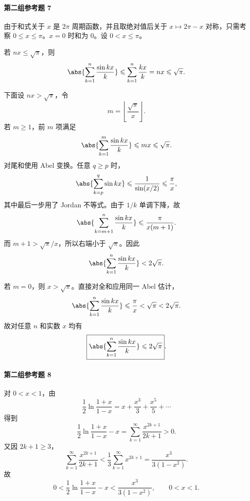 \paragraph{第二组参考题 7}
\begin{xsolution}
由于和式关于 $x$ 是 $2\pi$ 周期函数，并且取绝对值后关于 $x\mapsto2\pi-x$ 对称，只需考察 $0\leqslant x\leqslant\pi$。$x=0$ 时和为 $0$。设 $0<x\leqslant\pi$。

若 $nx\leqslant\sqrt\pi$，则
\[
  \abs{\sum_{k=1}^{n}\frac{\sin kx}{k}}
  \leqslant\sum_{k=1}^{n}\frac{kx}{k}
  =nx\leqslant\sqrt\pi.
\]

下面设 $nx>\sqrt\pi$，令
\[
  m=\left\lfloor\frac{\sqrt\pi}{x}\right\rfloor.
\]
若 $m\geqslant1$，前 $m$ 项满足
\[
  \abs{\sum_{k=1}^{m}\frac{\sin kx}{k}}
  \leqslant mx\leqslant\sqrt\pi.
\]
对尾和使用 Abel 变换。任意 $q\geqslant p$ 时，
\[
  \abs{\sum_{k=p}^{q}\sin kx}
  \leqslant\frac1{\sin(x/2)}
  \leqslant\frac\pi x,
\]
其中最后一步用了 Jordan 不等式。由于 $1/k$ 单调下降，故
\[
  \abs{\sum_{k=m+1}^{n}\frac{\sin kx}{k}}
  \leqslant\frac{\pi}{x(m+1)}.
\]
而 $m+1>\sqrt\pi/x$，所以右端小于 $\sqrt\pi$。因此
\[
  \abs{\sum_{k=1}^{n}\frac{\sin kx}{k}}<2\sqrt\pi.
\]

若 $m=0$，则 $x>\sqrt\pi$。直接对全和应用同一 Abel 估计，
\[
  \abs{\sum_{k=1}^{n}\frac{\sin kx}{k}}
  \leqslant\frac\pi x<\sqrt\pi<2\sqrt\pi.
\]
故对任意 $n$ 和实数 $x$ 均有
\[
  \boxed{
  \abs{\sum_{k=1}^{n}\frac{\sin kx}{k}}\leqslant2\sqrt\pi}.
\]
\end{xsolution}

\paragraph{第二组参考题 8}
\begin{xsolution}
对 $0<x<1$，由
\[
  \frac12\ln\frac{1+x}{1-x}
  =x+\frac{x^3}{3}+\frac{x^5}{5}+\cdots
\]
得到
\[
  \frac12\ln\frac{1+x}{1-x}-x
  =\sum_{k=1}^{\infty}\frac{x^{2k+1}}{2k+1}>0.
\]
又因 $2k+1\geqslant3$，
\[
  \sum_{k=1}^{\infty}\frac{x^{2k+1}}{2k+1}
  <\frac13\sum_{k=1}^{\infty}x^{2k+1}
  =\frac{x^3}{3(1-x^2)}.
\]
故
\[
  \boxed{
  0<\frac12\ln\frac{1+x}{1-x}-x
  <\frac{x^3}{3(1-x^2)}},
  \qquad0<x<1.
\]
\end{xsolution}


